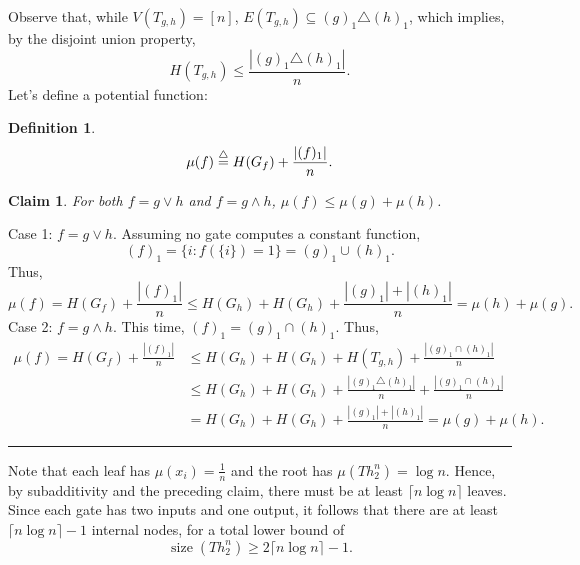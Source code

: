 \documentclass[twoside]{article}
\newcounter{tnum}
\newtheorem{claim}[tnum]{Claim}
\newtheorem{definition}[tnum]{Definition}
\newenvironment{proof}{{\bf Proof:}}{\hfill\rule{2mm}{2mm}}
\newcommand\size{\operatorname{size}}
\begin{document}
Observe that, while $V(T_{g,h}) = [n]$,
$E(T_{g,h}) \subseteq (g)_1 \triangle (h)_1$, which implies, by the disjoint
union property,
\[H(T_{g,h})
    \leq \frac{\left| (g)_1 \triangle (h)_1 \right|}{n}.
\]
Let's define a potential function:
\begin{definition}
\[\mu(f) 
    \buildrel\triangle\over = H(G_f) + \frac{\left| (f)_1 \right|}{n}.
\]
\end{definition}

\begin{claim}
For both $f = g \vee h$ and $f = g \wedge h$, $\mu(f) \leq \mu(g) + \mu(h)$.
\end{claim}
\begin{proof}
Case 1: $f = g \vee h$. Assuming no gate computes a constant function,
\[(f)_1 = \{i : f(\{i\}) = 1\} = (g)_1 \cup (h)_1.\]
Thus,
\[\mu(f)
  = H(G_f) + \frac{\left| (f)_1 \right |}{n}
  \leq H(G_h) + H(G_h) + \frac{\left| (g)_1 \right | + \left| (h)_1 \right|}{n}
  = \mu(h) + \mu(g).
\]
Case 2: $f = g \wedge h$. This time, $(f)_1 = (g)_1 \cap (h)_1$. Thus,
\begin{align*}
\mu(f)
    = H(G_f) + \frac{|(f)_1|}{n}
 &  \leq H(G_h) + H(G_h) + H(T_{g,h}) + \frac{|(g)_1 \cap (h)_1|}{n}        \\
 &  \leq H(G_h) + H(G_h)
        + \frac{|(g)_1 \triangle (h)_1|}{n} + \frac{|(g)_1 \cap (h)_1|}{n}  \\
 &  = H(G_h) + H(G_h) + \frac{|(g)_1| + |(h)_1|}{n}
    = \mu(g) + \mu(h).
\end{align*}

\end{proof}

Note that each leaf has $\mu(x_i) = \frac{1}{n}$ and the root has
$\mu(Th_2^n) = \log n$. Hence, by subadditivity and the preceding claim,
there must be at least $\lceil n \log n \rceil$ leaves. Since each gate has two
inputs and one output, it follows that there are at least
$\lceil n \log n \rceil - 1$ internal nodes, for a total lower bound of
\[\size(Th_2^n) \geq 2\lceil n \log n \rceil - 1.\]
\end{document}
